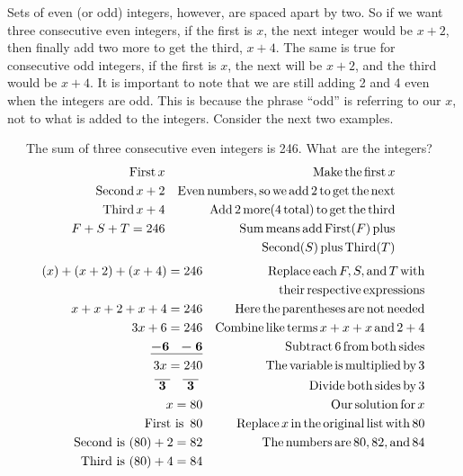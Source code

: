 Sets of even (or odd) integers, however, are
spaced apart by two. So if we want three consecutive even integers, if the
first is $x$, the next integer would be $x + 2$, then finally add two more to
get the third, $x + 4$. The same is true for consecutive odd integers, if the
first is $x$, the next will be $x + 2$, and the third would be $x + 4$. It is
important to note that we are still adding 2 and 4 even when the integers are
odd. This is because the phrase ``odd'' is referring to our $x$, not to what is
added to the integers. Consider the next two examples.

\begin{example}\label{Lin77}~~~The sum of three consecutive even integers is 246. What are the integers?
  \begin{eqnarray*}
    \operatorname{First} x &  & \operatorname{Make} \operatorname{the} \operatorname{first} x\\
    \operatorname{Second} x + 2 &  & \operatorname{Even} \operatorname{numbers}, \operatorname{so} \operatorname{we}
    \operatorname{add} 2 \operatorname{to} \operatorname{get} \operatorname{the} \operatorname{next}\\
    \operatorname{Third} x + 4 &  & \operatorname{Add} 2 \operatorname{more} (4 \operatorname{total})
    \operatorname{to} \operatorname{get} \operatorname{the} \operatorname{third}\\
    F + S + T = 246 &  & \operatorname{Sum} \operatorname{means} \operatorname{add} \operatorname{First} (F)
    \operatorname{plus}\\
		& & ~~~\operatorname{Second} (S) \operatorname{plus} \operatorname{Third} (T)
    \end{eqnarray*}
    \begin{eqnarray*}
	(x) + (x + 2) + (x + 4) = 246 &  & \operatorname{Replace} \operatorname{each} F, S,
    \operatorname{and} T \operatorname{with}\\
		& & ~~~\operatorname{their} \operatorname{respective} \operatorname{expressions}\\  
  	x + x + 2 + x + 4 = 246 &  & \operatorname{Here} \operatorname{the} \operatorname{parentheses}
    \operatorname{are} \operatorname{not} \operatorname{needed}\\
    3 x + 6 = 246 &  & \operatorname{Combine} \operatorname{like} \operatorname{terms} x + x + x
    \operatorname{and} 2 + 4\\
    \boldsymbol{\underline{- 6 ~~- 6}} &  & \operatorname{Subtract} 6 \operatorname{from}
    \operatorname{both} \operatorname{sides}\\
    3 x = 240 &  & \operatorname{The} \operatorname{variable} \operatorname{is} \operatorname{multiplied}
    \operatorname{by} 3\\
    \boldsymbol{\overline{~3~} ~~~ \overline{~3~}}~ &  & \operatorname{Divide} \operatorname{both}
    \operatorname{sides} \operatorname{by} 3\\
    x = 80 &  & \operatorname{Our} \operatorname{solution} \operatorname{for} x\\
    \operatorname{First~is~} 80 &  & \operatorname{Replace} x \operatorname{in} \operatorname{the}
    \operatorname{original} \operatorname{list} \operatorname{with} 80\\
    \operatorname{Second~is~} (80) + 2 = 82 &  & \operatorname{The} \operatorname{numbers} \operatorname{are} 80,
    82, \operatorname{and} 84\\
    \operatorname{Third~is~} (80) + 4 = 84 &  & 
  \end{eqnarray*}
\end{example}

